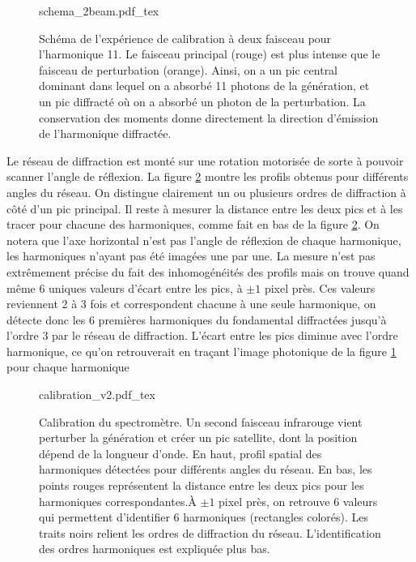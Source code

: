 \begin{figure}[!ht]
\centering
\def\svgwidth{\columnwidth}
{schema_2beam.pdf_tex}
\caption{Schéma de l'expérience de calibration à deux faisceau pour l'harmonique 11. Le faisceau principal (rouge) est plus intense que le faisceau de perturbation (orange). Ainsi, on a un pic central dominant dans lequel on a absorbé 11 photons de la génération, et un pic diffracté où on a absorbé un photon de la perturbation. La conservation des moments donne directement la direction d'émission de l'harmonique diffractée.}
\label{Fig:DiffSchema}
\end{figure}

Le réseau de diffraction est monté sur une rotation motorisée de sorte à pouvoir scanner l'angle de réflexion. La figure \ref{Fig:calibration} montre les profils obtenus pour différents angles du réseau. On distingue clairement un ou plusieurs ordres de diffraction à côté d'un pic principal. Il reste à mesurer la distance entre les deux pics et à les tracer pour chacune des harmoniques, comme fait en bas de la figure \ref{Fig:calibration}. On notera que l'axe horizontal n'est pas l'angle de réflexion de chaque harmonique, les harmoniques n'ayant pas été imagées une par une. La mesure n'est pas extrêmement précise du fait des inhomogénéités des profils mais on trouve quand même 6 uniques valeurs d'écart entre les pics, à $\pm 1$ pixel près. Ces valeurs reviennent 2 à 3 fois et correspondent chacune à une seule harmonique, on détecte donc les 6 premières harmoniques du fondamental diffractées jusqu'à l'ordre 3 par le réseau de diffraction. L'écart entre les pics diminue avec l'ordre harmonique, ce qu'on retrouverait en traçant l'image photonique de la figure \ref{Fig:DiffSchema} pour chaque harmonique

\begin{figure}[!ht]
\centering
\def\svgwidth{\columnwidth}
{calibration_v2.pdf_tex}
\caption{Calibration du spectromètre. Un second faisceau infrarouge vient perturber la génération et créer un pic satellite, dont la position dépend de la longueur d'onde. En haut, profil spatial des harmoniques détectées pour différents angles du réseau. En bas, les points rouges représentent la distance entre les deux pics pour les harmoniques correspondantes.\`{A} $\pm1$ pixel près, on retrouve 6 valeurs qui permettent d'identifier 6 harmoniques (rectangles colorés). Les traits noirs relient les ordres de diffraction du réseau. L'identification des ordres harmoniques est expliquée plus bas.}
\label{Fig:calibration}
\end{figure}

